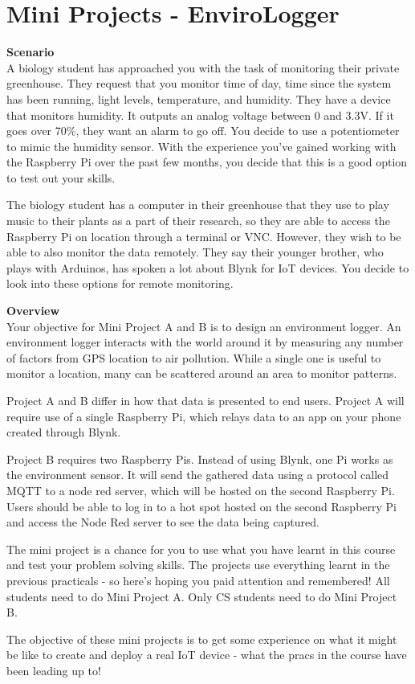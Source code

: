 \section{Mini Projects - EnviroLogger}
\textbf{Scenario}\\
A biology student has approached you with the task of monitoring their private greenhouse. They request that you monitor time of day, time since the system has been running, light levels, temperature, and humidity. They have a device that monitors humidity. It outputs an analog voltage between 0 and 3.3V. If it goes over 70\%, they want an alarm to go off. You decide to use a potentiometer to mimic the humidity sensor. With the experience you've gained working with the Raspberry Pi over the past few months, you decide that this is a good option to test out your skills.

The biology student has a computer in their greenhouse that they use to play music to their plants as a part of their research, so they are able to access the Raspberry Pi on location through a terminal or VNC. However, they wish to be able to also monitor the data remotely. They say their younger brother, who plays with Arduinos, has spoken a lot about Blynk for IoT devices. You decide to look into these options for remote monitoring. 

\textbf{Overview}\\
Your objective for Mini Project A and B is to design an environment logger. An environment logger interacts with the world around it by measuring any number of factors from GPS location to air pollution. While a single one is useful to monitor a location, many can be scattered around an area to monitor patterns.

Project A and B differ in how that data is presented to end users. Project A will require use of a single Raspberry Pi, which relays data to an app on your phone created through Blynk.

Project B requires two Raspberry Pis. Instead of using Blynk, one Pi works as the environment sensor. It will send the gathered data using a protocol called MQTT to a node red server, which will be hosted on the second Raspberry Pi. Users should be able to log in to a hot spot hosted on the second Raspberry Pi and access the Node Red server to see the data being captured.

The mini project is a chance for you to use what you have learnt in this course and test your problem solving skills. The projects use everything learnt in the previous practicals - so here's hoping you paid attention and remembered! All students need to do Mini Project A. Only CS students need to do Mini Project B.

The objective of these mini projects is to get some experience on what it might be like to create and deploy a real IoT device - what the pracs in the course have been leading up to!







